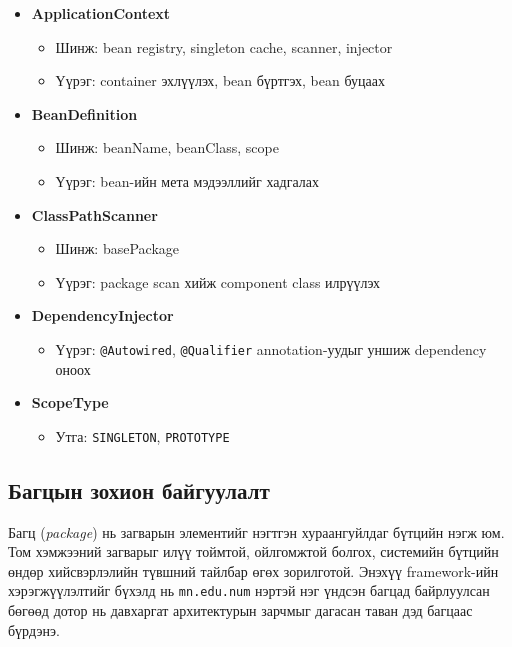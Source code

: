 \begin{itemize}
    \item \textbf{ApplicationContext}
    \begin{itemize}
        \item Шинж: bean registry, singleton cache, scanner, injector
        \item Үүрэг: container эхлүүлэх, bean бүртгэх, bean буцаах
    \end{itemize}

    \item \textbf{BeanDefinition}
    \begin{itemize}
        \item Шинж: beanName, beanClass, scope
        \item Үүрэг: bean-ийн мета мэдээллийг хадгалах
    \end{itemize}

    \item \textbf{ClassPathScanner}
    \begin{itemize}
        \item Шинж: basePackage
        \item Үүрэг: package scan хийж component class илрүүлэх
    \end{itemize}

    \item \textbf{DependencyInjector}
    \begin{itemize}
        \item Үүрэг: \texttt{@Autowired}, \texttt{@Qualifier} annotation-уудыг уншиж dependency оноох
    \end{itemize}

    \item \textbf{ScopeType}
    \begin{itemize}
        \item Утга: \texttt{SINGLETON}, \texttt{PROTOTYPE}
    \end{itemize}
\end{itemize}

\subsection{Багцын зохион байгуулалт}

Багц (\textit{package}) нь загварын элементийг нэгтгэн хураангуйлдаг
бүтцийн нэгж юм. Том хэмжээний загварыг илүү тоймтой, ойлгомжтой
болгох, системийн бүтцийн өндөр хийсвэрлэлийн түвшний тайлбар
өгөх зорилготой. Энэхүү framework-ийн хэрэгжүүлэлтийг бүхэлд нь
\texttt{mn.edu.num} нэртэй нэг үндсэн багцад байрлуулсан бөгөөд
дотор нь давхаргат архитектурын зарчмыг дагасан таван дэд багцаас
бүрдэнэ.

